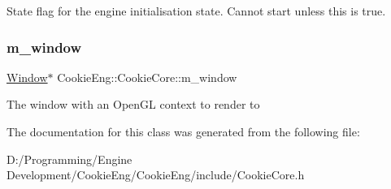 State flag for the engine initialisation state. Cannot start unless this is true. \mbox{\label{class_cookie_eng_1_1_cookie_core_ab95ee714d9d00c4a43859d0e427ea577}} 
\subsubsection{\texorpdfstring{m\+\_\+window}{m\_window}}
{\footnotesize\ttfamily \hyperlink{class_cookie_eng_1_1_window}{Window}$\ast$ Cookie\+Eng\+::\+Cookie\+Core\+::m\+\_\+window\hspace{0.3cm}{\ttfamily [protected]}}

The window with an Open\+GL context to render to 

The documentation for this class was generated from the following file\+:\begin{DoxyCompactItemize}
\item 
D\+:/\+Programming/\+Engine Development/\+Cookie\+Eng/\+Cookie\+Eng/include/Cookie\+Core.\+h\end{DoxyCompactItemize}
